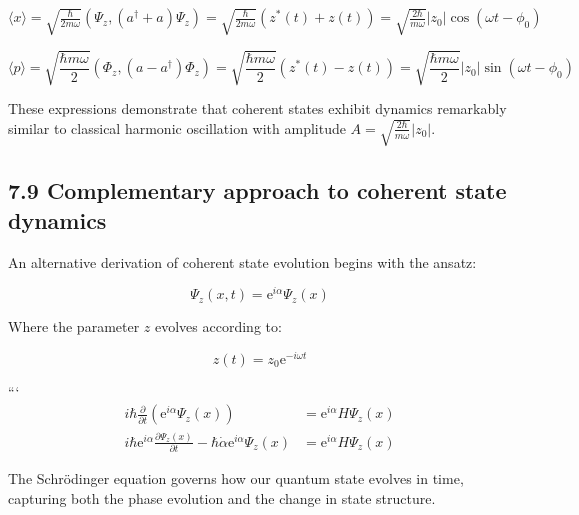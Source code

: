 \documentclass[italian]{HKNdocument}
\begin{document}
$\langle x\rangle=\sqrt{\frac{\hbar}{2 m \omega}}\left(\Psi_{z},\left(a^{\dagger}+a\right) \Psi_{z}\right)=\sqrt{\frac{\hbar}{2 m \omega}}\left(z^{*}(t)+z(t)\right)=\sqrt{\frac{2 \hbar}{m \omega}}\left|z_{0}\right| \cos \left(\omega t-\phi_{0}\right)$

\begin{equation*}
\langle p\rangle=\sqrt{\frac{\hbar m \omega}{2}}\left(\Phi_{z},\left(a-a^{\dagger}\right) \Phi_{z}\right)=\sqrt{\frac{\hbar m \omega}{2}}\left(z^{*}(t)-z(t)\right)=\sqrt{\frac{\hbar m \omega}{2}}\left|z_{0}\right| \sin \left(\omega t-\phi_{0}\right) \tag{7.90}
\end{equation*}

These expressions demonstrate that coherent states exhibit dynamics remarkably similar to classical harmonic oscillation with amplitude $A=\sqrt{\frac{2 \hbar}{m \omega}}\left|z_{0}\right|$.

\subsection*{7.9 Complementary approach to coherent state dynamics}
An alternative derivation of coherent state evolution begins with the ansatz:

\begin{equation*}
\Psi_{z}(x, t)=\mathrm{e}^{i \alpha} \Psi_{z}(x) \tag{7.91}
\end{equation*}

Where the parameter $z$ evolves according to:

\begin{equation*}
z(t)=z_{0} \mathrm{e}^{-i \omega t} \tag{7.92}
\end{equation*}

```
\begin{align*}
i \hbar \frac{\partial}{\partial t}\left(\mathrm{e}^{i \alpha} \Psi_{z}(x)\right) & =\mathrm{e}^{i \alpha} H \Psi_{z}(x) \\
i \hbar \mathrm{e}^{i \alpha} \frac{\partial \Psi_{z}(x)}{\partial t}-\hbar \dot{\alpha} \mathrm{e}^{i \alpha} \Psi_{z}(x) & =\mathrm{e}^{i \alpha} H \Psi_{z}(x) \tag{7.93}
\end{align*}

The Schrödinger equation governs how our quantum state evolves in time, capturing both the phase evolution and the change in state structure.
\end{document}
